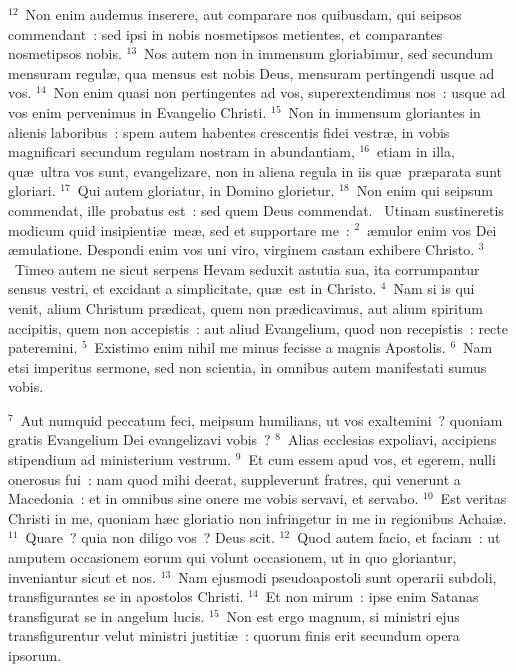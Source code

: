 ${}^{12}$~Non enim audemus inserere, aut comparare nos quibusdam, qui seipsos commendant~: sed ipsi in nobis nosmetipsos metientes, et comparantes nosmetipsos nobis.
${}^{13}$~Nos autem non in immensum gloriabimur, sed secundum mensuram regul\ae , qua mensus est nobis Deus, mensuram pertingendi usque ad vos.
${}^{14}$~Non enim quasi non pertingentes ad vos, superextendimus nos~: usque ad vos enim pervenimus in Evangelio Christi.
${}^{15}$~Non in immensum gloriantes in alienis laboribus~: spem autem habentes crescentis fidei vestr\ae , in vobis magnificari secundum regulam nostram in abundantiam,
${}^{16}$~etiam in illa, qu\ae\ ultra vos sunt, evangelizare, non in aliena regula in iis qu\ae\ pr\ae parata sunt gloriari.
${}^{17}$~Qui autem gloriatur, in Domino glorietur.
${}^{18}$~Non enim qui seipsum commendat, ille probatus est~: sed quem Deus commendat.
~Utinam sustineretis modicum quid insipienti\ae\ me\ae , sed et supportare me~:
${}^{2}$~\ae mulor enim vos Dei \ae mulatione. Despondi enim vos uni viro, virginem castam exhibere Christo.
${}^{3}$~Timeo autem ne sicut serpens Hevam seduxit astutia sua, ita corrumpantur sensus vestri, et excidant a simplicitate, qu\ae\ est in Christo.
${}^{4}$~Nam si is qui venit, alium Christum pr\ae dicat, quem non pr\ae dicavimus, aut alium spiritum accipitis, quem non accepistis~: aut aliud Evangelium, quod non recepistis~: recte pateremini.
${}^{5}$~Existimo enim nihil me minus fecisse a magnis Apostolis.
${}^{6}$~Nam etsi imperitus sermone, sed non scientia, in omnibus autem manifestati sumus vobis.


${}^{7}$~Aut numquid peccatum feci, meipsum humilians, ut vos exaltemini~? quoniam gratis Evangelium Dei evangelizavi vobis~?
${}^{8}$~Alias ecclesias expoliavi, accipiens stipendium ad ministerium vestrum.
${}^{9}$~Et cum essem apud vos, et egerem, nulli onerosus fui~: nam quod mihi deerat, suppleverunt fratres, qui venerunt a Macedonia~: et in omnibus sine onere me vobis servavi, et servabo.
${}^{10}$~Est veritas Christi in me, quoniam h\ae c gloriatio non infringetur in me in regionibus Achai\ae .
${}^{11}$~Quare~? quia non diligo vos~? Deus scit.
${}^{12}$~Quod autem facio, et faciam~: ut amputem occasionem eorum qui volunt occasionem, ut in quo gloriantur, inveniantur sicut et nos.
${}^{13}$~Nam ejusmodi pseudoapostoli sunt operarii subdoli, transfigurantes se in apostolos Christi.
${}^{14}$~Et non mirum~: ipse enim Satanas transfigurat se in angelum lucis.
${}^{15}$~Non est ergo magnum, si ministri ejus transfigurentur velut ministri justiti\ae~: quorum finis erit secundum opera ipsorum.


